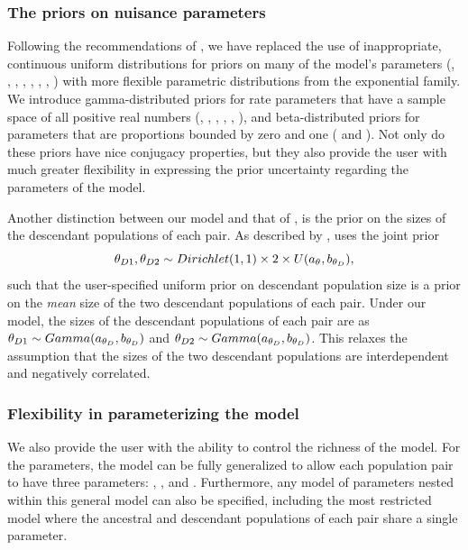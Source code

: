 \documentclass[letterpaper,12pt]{article}
\begin{document}
\begin{linenumbers}
\subsubsection*{The priors on nuisance parameters}
Following the recommendations of \citet{Oaks2012}, we have replaced the use of
inappropriate, continuous uniform distributions for priors on many of the
model's parameters (\divTime{}, \ancestralTheta{}, ,
, , ,
\recombinationRate, \migrationRate{}) with more flexible parametric
distributions from the exponential family.
We introduce gamma-distributed priors for rate parameters that have a sample
space of all positive real numbers (\divTime{}, \ancestralTheta{},
, , \recombinationRate,
\migrationRate{}), and beta-distributed priors for parameters that are
proportions bounded by zero and one ( and
).
Not only do these priors have nice conjugacy properties, but they also provide
the user with much greater flexibility in expressing the prior uncertainty
regarding the parameters of the model.

Another distinction between our model and that of \msb, is the prior on the
sizes of the descendant populations of each pair.
As described by \citet{Oaks2012}, \msb uses the joint prior
\begin{equation}
    \descendantTheta{1}{}, \descendantTheta{2}{} \sim
    Dirichlet(1,1) \times 2 \times U(\uniformMin{\myTheta{}},
    \uniformMax{\descendantTheta{}{}}),
    \label{eq:jointThetaPrior}
\end{equation}
such that the user-specified uniform prior on descendant population
size is a prior on the \emph{mean} size of the two descendant
populations of each pair.
Under our model, the sizes of the descendant populations of each
pair are \iid as
$\descendantTheta{1}{} \sim Gamma(\gammaShape{\descendantTheta{}{}},
\gammaScale{\descendantTheta{}{}})$
and
$\descendantTheta{2}{} \sim Gamma(\gammaShape{\descendantTheta{}{}},
\gammaScale{\descendantTheta{}{}})$.
This relaxes the assumption that the sizes of the two descendant populations
are interdependent and negatively correlated.

\subsubsection*{Flexibility in parameterizing the model}
We also provide the user with the ability to control the richness of
the model.
For the \myTheta{} parameters, the model can be fully generalized to
allow each population pair to have three parameters:
\ancestralTheta{}, , and .
Furthermore, any model of \myTheta{} parameters nested within this
general model can also be specified, including the most restricted model
where the ancestral and descendant populations of each pair share
a single \myTheta{} parameter.


\end{linenumbers}
\end{document}
